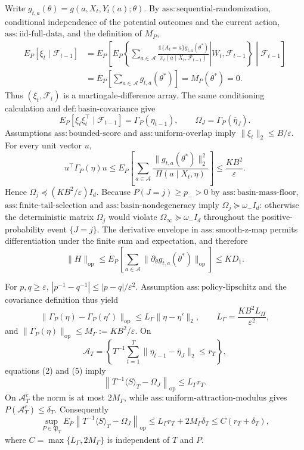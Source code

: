 Write \(g_{t,a}(\theta)=g(a,X_t,Y_t(a);\theta)\).  By
\(\mathrm{ass:sequential\text{-}randomization}\), conditional independence of
the potential outcomes and the current action, \(\mathrm{ass:iid\text{-}full\text{-}data}\),
and the definition of \(M_P\),
\[
 \begin{aligned}
 E_P[\xi_t\mid\mathcal F_{t-1}]
 &=E_P\!\left[
 E_P\!\left\{\left.\sum_{a\in\mathcal A}
 \frac{\mathbf1\{A_t=a\}g_{t,a}(\theta^*)}
 {\pi_t(a\mid X_t,\mathcal F_{t-1})}
 \right|W_t,\mathcal F_{t-1}\right\}
 \middle|\mathcal F_{t-1}\right]\\
 &=E_P\!\left[\sum_{a\in\mathcal A}g_{t,a}(\theta^*)\right]
 =M_P(\theta^*)=0.
 \end{aligned}
\tag{1}
\]
Thus \((\xi_t,\mathcal F_t)\) is a martingale-difference array.  The same
conditioning calculation and \(\mathrm{def:basin\text{-}covariance}\) give
\[
 E_P[\xi_t\xi_t^\top\mid\mathcal F_{t-1}]
 =\Gamma_P(\eta_{t-1}),
 \qquad \Omega_J=\Gamma_P(\bar\eta_J).
\tag{2}
\]
Assumptions \(\mathrm{ass:bounded\text{-}score}\) and
\(\mathrm{ass:uniform\text{-}overlap}\) imply \(\|\xi_t\|_2\le B/\varepsilon\).
For every unit vector \(u\),
\[
 u^\top\Gamma_P(\eta)u
 \le E_P\!\left[\sum_{a\in\mathcal A}
 \frac{\|g_{t,a}(\theta^*)\|_2^2}{\Pi(a\mid X_t,\eta)}\right]
 \le\frac{KB^2}{\varepsilon}.
\tag{3}
\]
Hence \(\Omega_j\preceq(KB^2/\varepsilon)I_d\).  Because
\(P(J=j)\ge p_->0\) by \(\mathrm{ass:basin\text{-}mass\text{-}floor}\),
\(\mathrm{ass:finite\text{-}tail\text{-}selection}\) and
\(\mathrm{ass:basin\text{-}nondegeneracy}\) imply
\(\Omega_j\succeq\omega_-I_d\): otherwise the deterministic matrix
\(\Omega_j\) would violate \(\Omega_\infty\succeq\omega_-I_d\) throughout
the positive-probability event \(\{J=j\}\).  The derivative envelope in
\(\mathrm{ass:smooth\text{-}z\text{-}map}\) permits differentiation under the
finite sum and expectation, and therefore
\[
 \|H\|_{\mathrm{op}}
 \le E_P\!\left[\sum_{a\in\mathcal A}
 \|\partial_\theta g_{t,a}(\theta^*)\|_{\mathrm{op}}\right]
 \le KD_1.
\tag{4}
\]

For \(p,q\ge\varepsilon\), \(|p^{-1}-q^{-1}|\le
|p-q|/\varepsilon^2\).  Assumption \(\mathrm{ass:policy\text{-}lipschitz}\)
and the covariance definition thus yield
\[
 \|\Gamma_P(\eta)-\Gamma_P(\eta')\|_{\mathrm{op}}
 \le L_\Gamma\|\eta-\eta'\|_2,
 \qquad L_\Gamma=\frac{KB^2L_\Pi}{\varepsilon^2},
\tag{5}
\]
and \(\|\Gamma_P(\eta)\|_{\mathrm{op}}\le
M_\Gamma:=KB^2/\varepsilon\).  On
\[
 \mathcal A_T=\left\{T^{-1}\sum_{t=1}^T
 \|\eta_{t-1}-\bar\eta_J\|_2\le r_T\right\},
\]
equations (2) and (5) imply
\[
 \left\|T^{-1}\langle S\rangle_T-\Omega_J\right\|_{\mathrm{op}}
 \le L_\Gamma r_T.
\tag{6}
\]
On \(\mathcal A_T^c\) the norm is at most \(2M_\Gamma\), while
\(\mathrm{ass:uniform\text{-}attraction\text{-}modulus}\) gives
\(P(\mathcal A_T^c)\le\delta_T\).  Consequently
\[
 \sup_{P\in\mathfrak P_T}E_P\!\left\|T^{-1}\langle S\rangle_T-
 \Omega_J\right\|_{\mathrm{op}}
 \le L_\Gamma r_T+2M_\Gamma\delta_T
 \le C(r_T+\delta_T),
\tag{7}
\]
where \(C=\max\{L_\Gamma,2M_\Gamma\}\) is independent of \(T\) and \(P\).

